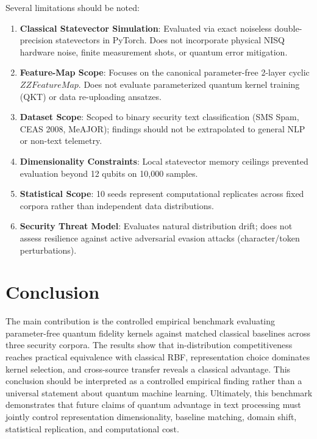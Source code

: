 \documentclass{article}
\begin{document}
Several limitations should be noted:
\begin{enumerate}
    \setlength{\itemsep}{1pt}
    \item \textbf{Classical Statevector Simulation}: Evaluated via exact noiseless double-precision statevectors in PyTorch. Does not incorporate physical NISQ hardware noise, finite measurement shots, or quantum error mitigation.
    \item \textbf{Feature-Map Scope}: Focuses on the canonical parameter-free 2-layer cyclic $ZZFeatureMap$. Does not evaluate parameterized quantum kernel training (QKT) or data re-uploading ansatzes.
    \item \textbf{Dataset Scope}: Scoped to binary security text classification (SMS Spam, CEAS 2008, MeAJOR); findings should not be extrapolated to general NLP or non-text telemetry.
    \item \textbf{Dimensionality Constraints}: Local statevector memory ceilings prevented evaluation beyond 12 qubits on 10,000 samples.
    \item \textbf{Statistical Scope}: 10 seeds represent computational replicates across fixed corpora rather than independent data distributions.
    \item \textbf{Security Threat Model}: Evaluates natural distribution drift; does not assess resilience against active adversarial evasion attacks (character/token perturbations).
\end{enumerate}

\section{Conclusion}
\label{sec:concl}

The main contribution is the controlled empirical benchmark evaluating parameter-free quantum fidelity kernels against matched classical baselines across three security corpora. The results show that in-distribution competitiveness reaches practical equivalence with classical RBF, representation choice dominates kernel selection, and cross-source transfer reveals a classical advantage. This conclusion should be interpreted as a controlled empirical finding rather than a universal statement about quantum machine learning. Ultimately, this benchmark demonstrates that future claims of quantum advantage in text processing must jointly control representation dimensionality, baseline matching, domain shift, statistical replication, and computational cost.
\end{document}
